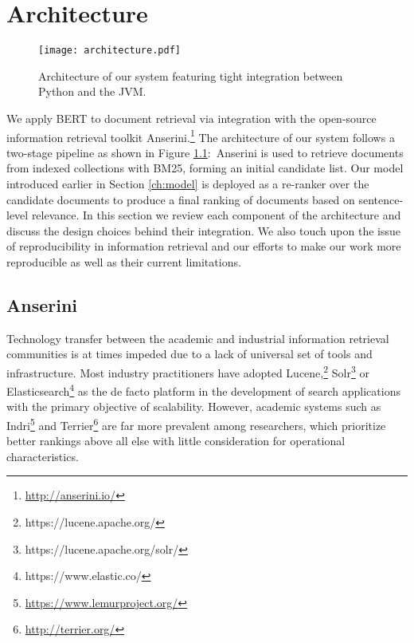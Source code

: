 \chapter{Architecture}
\label{ch:arch}

\begin{figure}[b!]
\centering
  \texttt{[image: architecture.pdf]}
\caption{Architecture of our system featuring tight integration between Python and the JVM.}
\label{fig:arch}
\end{figure}

We apply BERT to document retrieval via integration with the open-source information retrieval toolkit Anserini.\footnote{\url{http://anserini.io/}}
The architecture of our system follows a two-stage pipeline as shown in Figure \ref{fig:arch}:\
Anserini is used to retrieve documents from indexed collections with BM25, forming an initial candidate list.
Our model introduced earlier in Section \ref{ch:model} is deployed as a re-ranker over the candidate documents to produce a final ranking of documents based on sentence-level relevance.
In this section we review each component of the architecture and discuss the design choices behind their integration.
We also touch upon the issue of reproducibility in information retrieval and our efforts to make our work more reproducible as well as their current limitations.

\section{Anserini}

Technology transfer between the academic and industrial information retrieval communities is at times impeded due to a lack of universal set of tools and infrastructure.
Most industry practitioners have adopted Lucene,\footnote{https://lucene.apache.org/} Solr\footnote{https://lucene.apache.org/solr/} or Elasticsearch\footnote{https://www.elastic.co/} as the de facto platform in the development of search applications with the primary objective of scalability.
However, academic systems such as Indri\footnote{\url{https://www.lemurproject.org/}} and Terrier\footnote{\url{http://terrier.org/}} are far more prevalent among researchers, which prioritize better rankings above all else with little consideration for operational characteristics.


